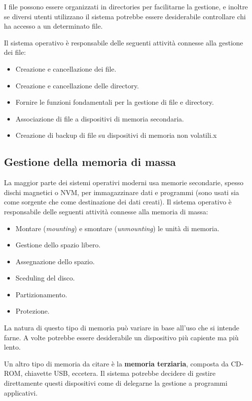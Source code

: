         I file possono essere organizzati in directories per facilitarne la gestione, e inoltre se diversi utenti utilizzano il sistema potrebbe essere desiderabile controllare chi ha accesso a un determinato file.
        
        Il sistema operativo è responsabile delle seguenti attività connesse alla gestione dei file:
        \begin{itemize}
            \item Creazione e cancellazione dei file.
            \item Creazione e cancellazione delle directory.
            \item Fornire le funzioni fondamentali per la gestione di file e directory.
            \item Associazione di file a dispositivi di memoria secondaria.
            \item Creazione di backup di file su dispositivi di memoria non volatili.x
        \end{itemize}
        
    \subsection{Gestione della memoria di massa}
        La maggior parte dei sistemi operativi moderni usa memorie secondarie, spesso dischi magnetici o NVM, per immagazzinare dati e programmi (sono usati sia come sorgente che come destinazione dei dati creati). Il sistema operativo è responsabile delle seguenti attività connesse alla memoria di massa:
        \begin{itemize}
            \item Montare (\textit{mounting}) e smontare (\textit{unmounting}) le unità di memoria.
            \item Gestione dello spazio libero.
            \item Assegnazione dello spazio.
            \item Sceduling del disco.
            \item Partizionamento.
            \item Protezione.
        \end{itemize}
        
        La natura di questo tipo di memoria può variare in base all'uso che si intende farne. A volte potrebbe essere desiderabile un dispositivo più capiente ma più lento.
        
        Un altro tipo di memoria da citare è la \textbf{memoria terziaria}, composta da CD-ROM, chiavette USB, eccetera. Il sistema potrebbe decidere di gestire direttamente questi dispositivi come di delegarne la gestione a programmi applicativi.
        
